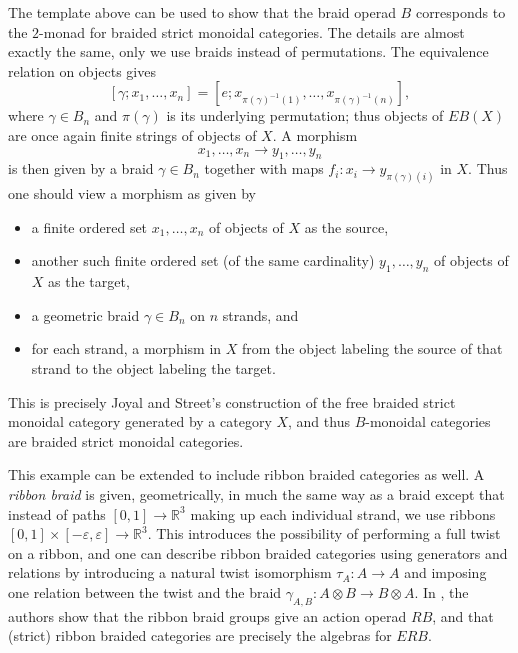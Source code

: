\begin{example}
The template above can be used to show that the braid operad $B$ corresponds to the $2$-monad for braided strict monoidal categories. The details are almost exactly the same, only we use braids instead of permutations. The equivalence relation on objects gives
  \[
    [\gamma; x_{1}, \ldots, x_{n}] = \left[e; x_{\pi(\gamma)^{-1}(1)}, \ldots, x_{\pi(\gamma)^{-1}(n)}\right],
  \]
where $\gamma \in B_{n}$ and $\pi(\gamma)$ is its underlying permutation; thus objects of $EB(X)$ are once again finite strings of objects of $X$. A morphism
  \[
    x_{1}, \ldots, x_{n} \rightarrow y_{1}, \ldots, y_{n}
  \]
is then given by a braid $\gamma \in B_{n}$ together with maps $f_{i} \colon x_{i} \rightarrow y_{\pi(\gamma)(i)}$ in $X$. Thus one should view a morphism as given by
\begin{itemize}
\item a finite ordered set $x_{1}, \ldots, x_{n}$ of objects of $X$ as the source,
\item another such finite ordered set (of the same cardinality) $y_{1}, \ldots, y_{n}$ of objects of $X$ as the target,
\item a geometric braid $\gamma \in B_{n}$ on $n$ strands, and
\item for each strand, a morphism in $X$ from the object labeling the source of that strand to the object labeling the target.
\end{itemize}
This is precisely Joyal and Street's \cite{js} construction of the free braided strict monoidal category generated by a category $X$, and thus $B$-monoidal categories are braided strict monoidal categories.

This example can be extended to include ribbon braided categories as well. A \textit{ribbon braid} is given, geometrically, in much the same way as a braid except that instead of paths $[0,1] \rightarrow \mathbb{R}^{3}$ making up each individual strand, we use ribbons
$[0,1] \times [-\varepsilon, \varepsilon] \rightarrow \mathbb{R}^{3}$. This introduces the possibility of performing a full twist on a ribbon, and one can describe ribbon braided categories using generators and relations by introducing a natural twist isomorphism $\tau_{A} \colon A \rightarrow A$ and imposing one relation between the twist and the braid $\gamma_{A,B} \colon A \otimes B \rightarrow B \otimes A$. In \cite{sal-wahl}, the authors show that the ribbon braid groups give an action operad $RB$, and that (strict) ribbon braided categories are precisely the algebras for $ERB$.
\end{example}



